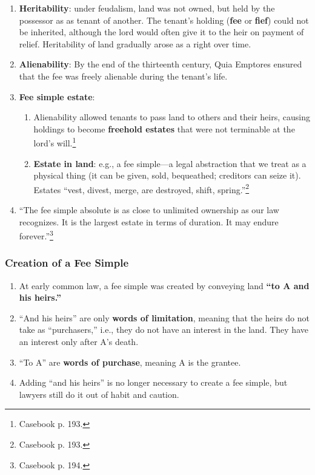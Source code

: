 \begin{enumerate}
    \item \textbf{Heritability}: under feudalism, land was not owned, but held 
    by the possessor as as tenant of another. The tenant's holding 
    (\textbf{fee} or \textbf{fief}) could not be inherited, although the lord 
    would often give it to the heir on payment of relief. Heritability of land 
    gradually arose as a right over time.
    \item \textbf{Alienability}: By the end of the thirteenth century, Quia 
    Emptores ensured that the fee was freely alienable during the tenant's 
    life.
    \item \textbf{Fee simple estate}:
    \begin{enumerate}
        \item Alienability allowed tenants to pass land to others and their 
        heirs, causing holdings to become \textbf{freehold estates} that were 
        not terminable at the lord's will.\footnote{Casebook p. 193.}
        \item \textbf{Estate in land}: e.g., a fee simple---a legal 
        abstraction that we treat as a physical thing (it can be given, sold, 
        bequeathed; creditors can seize it). Estates ``vest, divest, merge, 
        are destroyed, shift, spring.''\footnote{Casebook p. 193.}
    \end{enumerate}
    \item ``The fee simple absolute is as close to unlimited ownership as our 
    law recognizes. It is the largest estate in terms of duration. It may 
    endure forever.''\footnote{Casebook p. 194.}
\end{enumerate}

\subsubsection{Creation of a Fee Simple}

\begin{enumerate}
    \item At early common law, a fee simple was created by conveying land 
    \textbf{``to A and his heirs.''}
    \item ``And his heirs'' are only \textbf{words of limitation}, meaning 
    that the heirs do not take as ``purchasers,'' i.e., they do not have an 
    interest in the land. They have an interest only after A's death.
    \item ``To A'' are \textbf{words of purchase}, meaning A is the grantee.
    \item Adding ``and his heirs'' is no longer necessary to create a fee 
    simple, but lawyers still do it out of habit and caution.
\end{enumerate}

